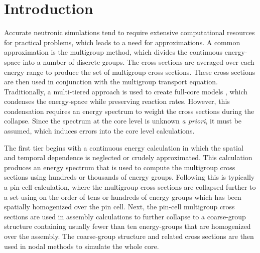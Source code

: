 \documentclass[5p,times,twocolumn,10pt]{elsarticle}
\begin{document}
    \section{Introduction}

    Accurate neutronic simulations tend to require extensive computational resources for practical problems, which leads to a need for approximations.
    A common approximation is the multigroup method, which divides the continuous energy-space into a number of discrete groups.
    The cross sections are averaged over each energy range to produce the set of multigroup cross sections.
    These cross sections are then used in conjunction with the multigroup transport equation.
    Traditionally, a multi-tiered approach is used to create full-core models \cite{hebert2007review}, which condenses the energy-space while preserving reaction rates.
    However, this condensation requires an energy spectrum to weight the cross sections during the collapse.
    Since the spectrum at the core level is unknown {\it a priori}, it must be assumed, which induces errors into the core level calculations.

    The first tier begins with a continuous energy calculation in which the spatial and temporal dependence is neglected or crudely approximated.
    This calculation produces an energy spectrum that is used to compute the multigroup cross sections using hundreds or thousands of energy groups.
    Following this is typically a pin-cell calculation, where the multigroup cross sections are collapsed further to a set using on the order of tens or hundreds of energy groups which has been spatially homogenized over the pin cell.
    Next, the pin-cell multigroup cross sections are used in assembly calculations to further collapse to a coarse-group structure containing usually fewer than ten energy-groups that are homogenized over the assembly.
    The coarse-group structure and related cross sections are then used in nodal methods to simulate the whole core.
\end{document}

